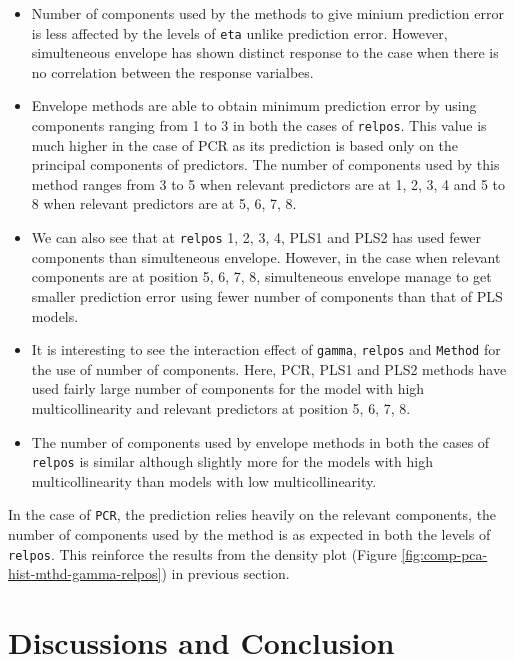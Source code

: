 \documentclass[12pt,3p,authoryear]{elsarticle}
\providecommand{\tightlist}{%
  \setlength{\itemsep}{0pt}\setlength{\parskip}{0pt}}
\begin{document}
\begin{itemize}
\tightlist
\item
  Number of components used by the methods to give minium prediction
  error is less affected by the levels of \texttt{eta} unlike prediction
  error. However, simulteneous envelope has shown distinct response to
  the case when there is no correlation between the response varialbes.
\item
  Envelope methods are able to obtain minimum prediction error by using
  components ranging from 1 to 3 in both the cases of \texttt{relpos}.
  This value is much higher in the case of PCR as its prediction is
  based only on the principal components of predictors. The number of
  components used by this method ranges from 3 to 5 when relevant
  predictors are at 1, 2, 3, 4 and 5 to 8 when relevant predictors are
  at 5, 6, 7, 8.
\item
  We can also see that at \texttt{relpos} 1, 2, 3, 4, PLS1 and PLS2 has
  used fewer components than simulteneous envelope. However, in the case
  when relevant components are at position 5, 6, 7, 8, simulteneous
  envelope manage to get smaller prediction error using fewer number of
  components than that of PLS models.
\item
  It is interesting to see the interaction effect of \texttt{gamma},
  \texttt{relpos} and \texttt{Method} for the use of number of
  components. Here, PCR, PLS1 and PLS2 methods have used fairly large
  number of components for the model with high multicollinearity and
  relevant predictors at position 5, 6, 7, 8.
\item
  The number of components used by envelope methods in both the cases of
  \texttt{relpos} is similar although slightly more for the models with
  high multicollinearity than models with low multicollinearity.
\end{itemize}

In the case of \texttt{PCR}, the prediction relies heavily on the
relevant components, the number of components used by the method is as
expected in both the levels of \texttt{relpos}. This reinforce the
results from the density plot (Figure
\ref{fig:comp-pca-hist-mthd-gamma-relpos}) in previous section.

\hypertarget{discussions-and-conclusion}{%
\section{Discussions and Conclusion}\label{discussions-and-conclusion}}

\hypertarget{refs}{}

\hypertarget{appendix-appendix-a}{%
\appendix}



\renewcommand\refname{References}

\end{document}
